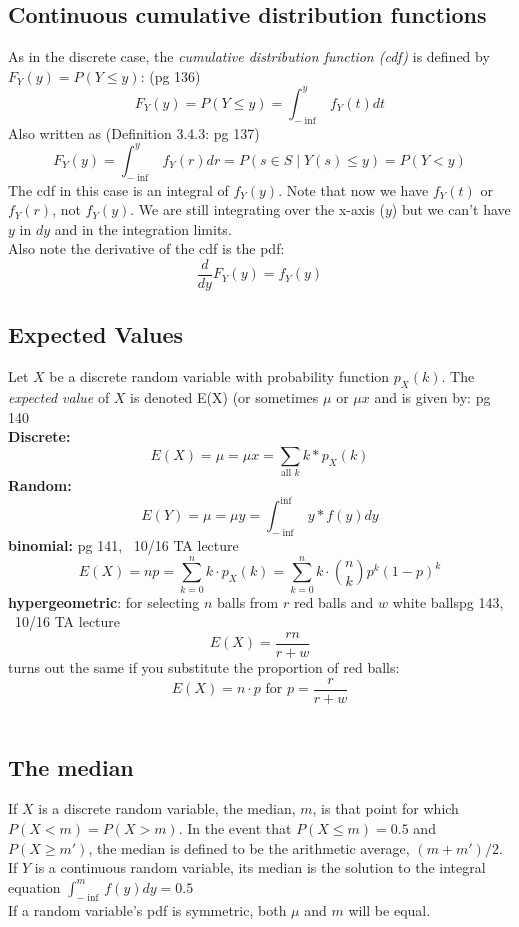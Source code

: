 \subsection{Continuous cumulative distribution functions}
As in the discrete case, the \textit{cumulative distribution function (cdf)} is defined by $F_Y(y) = P(Y \leq y)$: {\tiny (pg 136)}
	\[  F_Y(y) = P(Y \leq y) = \int_{- \inf}^{y} f_Y(t)dt \]
Also written as  {\tiny (Definition 3.4.3: pg 137)}
	\[  F_Y(y) = \int_{- \inf}^{y} f_Y(r)dr = P({s \in S \mid Y(s) \leq y}) = P(Y < y) \]
The cdf in this case is an integral of $f_Y(y)$.  Note that now we have $f_Y(t)$ or $f_Y(r)$, not $f_Y(y)$.  We are still integrating over the x-axis ($y$) but we can't have $y$ in $dy$ and in the integration limits.   \hfill \\  
Also note the derivative of the cdf is the pdf:
	\[  \frac{d}{dy}F_Y(y) = f_Y(y) \]
	
\subsection{Expected Values}
Let $X$ be a discrete random variable with probability function $p_X(k)$.  The \textit{expected value} of $X$ is denoted E(X) (or sometimes $\mu$ or $\mu x$ and is given by: {\tiny pg 140}   \hfill \\  
\textbf{Discrete:}
	\[  E(X) = \mu = \mu x = \sum\limits_{\mbox{all } k} k*p_X(k)  \]
\textbf{Random:}	  \hfill \\  
	\[  E(Y) = \mu = \mu y = \int_{- \inf}^{\inf} y*f(y)dy  \]
\textbf{binomial:} {\tiny pg 141, ~10/16 TA lecture} 	  \hfill \\
	\[ E(X) = np =  \sum\limits_{k=0}^{n} k \cdot p_X(k) = \sum\limits_{k=0}^{n}k \cdot {{n}\choose{k}}p^k(1-p)^k \]  
\textbf{hypergeometric}: for selecting $n$ balls from $r$ red balls and $w$ white balls{\tiny pg 143, ~10/16 TA lecture}  \hfill \\  
	\[ E(X) = \frac{rn}{r+w} \]
turns out the same if you substitute the proportion of red balls:
	\[ E(X) = n \cdot p \mbox{ for } p= \frac{r}{r+w} \]
\hfill \\  	

\subsection{The median}
If $X$ is a discrete random variable, the median, $m$, is that point for which $P(X < m) = P(X>m)$.  In the event that $P(X \leq m) = 0.5$ and $P(X \geq m')$, the median is defined to be the arithmetic average, $(m + m')/2$.  \hfill \\
If $Y$ is a continuous random variable, its median is the solution to the integral equation $\int_{- \inf}^{m} f(y)dy = 0.5$  \hfill \\
If a random variable's pdf is symmetric, both $\mu$ and $m$ will be equal.  

